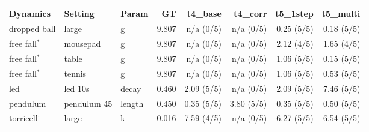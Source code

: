 \begin{tabular}{lll r r r r r}
\toprule
Dynamics & Setting & Param & GT & t4_base & t4_corr & t5_1step & t5_multi \\
\midrule
dropped ball & large & g & 9.807 & n/a (0/5) & n/a (0/5) & 0.25 (5/5) & 0.18 (5/5) \\
free fall$^\ast$ & mousepad & g & 9.807 & n/a (0/5) & n/a (0/5) & 2.12 (4/5) & 1.65 (4/5) \\
free fall$^\ast$ & table & g & 9.807 & n/a (0/5) & n/a (0/5) & 1.06 (5/5) & 0.15 (5/5) \\
free fall$^\ast$ & tennis & g & 9.807 & n/a (0/5) & n/a (0/5) & 1.06 (5/5) & 0.53 (5/5) \\
led & led 10s & decay & 0.460 & 2.09 (5/5) & n/a (0/5) & 2.09 (5/5) & 7.46 (5/5) \\
pendulum & pendulum 45 & length & 0.450 & 0.35 (5/5) & 3.80 (5/5) & 0.35 (5/5) & 0.50 (5/5) \\
torricelli & large & k & 0.016 & 7.59 (4/5) & n/a (0/5) & 6.27 (5/5) & 6.54 (5/5) \\
\bottomrule
\end{tabular}

